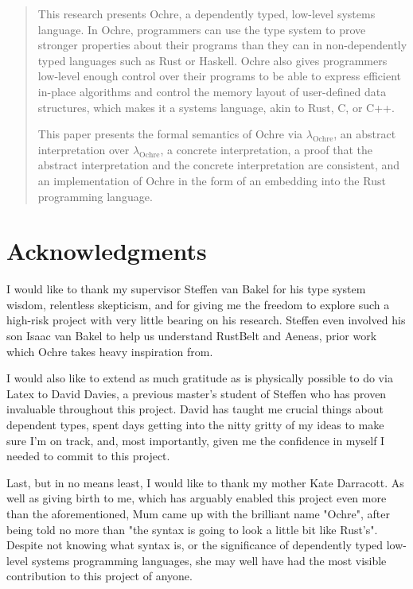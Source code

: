 \documentclass[12pt,twoside]{report}
\newcommand{\lochre}{$\lambda_\text{Ochre}$}
\begin{document}



\clearpage{\pagestyle{empty}\cleardoublepage}
\setcounter{page}{1}
\pagestyle{fancy}

\begin{abstract}
This research presents Ochre, a dependently typed, low-level systems language. In Ochre, programmers can use the type system to prove stronger properties about their programs than they can in non-dependently typed languages such as Rust or Haskell. Ochre also gives programmers low-level enough control over their programs to be able to express efficient in-place algorithms and control the memory layout of user-defined data structures, which makes it a systems language, akin to Rust, C, or C++.

This paper presents the formal semantics of Ochre via \lochre{}, an abstract interpretation over \lochre{}, a concrete interpretation, a proof that the abstract interpretation and the concrete interpretation are consistent, and an implementation of Ochre in the form of an embedding into the Rust programming language.
\end{abstract}

\cleardoublepage
\section*{Acknowledgments}
I would like to thank my supervisor Steffen van Bakel for his type system wisdom, relentless skepticism, and for giving me the freedom to explore such a high-risk project with very little bearing on his research. Steffen even involved his son Isaac van Bakel to help us understand RustBelt and Aeneas, prior work which Ochre takes heavy inspiration from.

I would also like to extend as much gratitude as is physically possible to do via Latex to David Davies, a previous master's student of Steffen who has proven invaluable throughout this project. David has taught me crucial things about dependent types, spent days getting into the nitty gritty of my ideas to make sure I'm on track, and, most importantly, given me the confidence in myself I needed to commit to this project.



Last, but in no means least, I would like to thank my mother Kate Darracott. As well as giving birth to me, which has arguably enabled this project even more than the aforementioned, Mum came up with the brilliant name "Ochre", after being told no more than "the syntax is going to look a little bit like Rust's". Despite not knowing what syntax is, or the significance of dependently typed low-level systems programming languages, she may well have had the most visible contribution to this project of anyone. 
\end{document}
